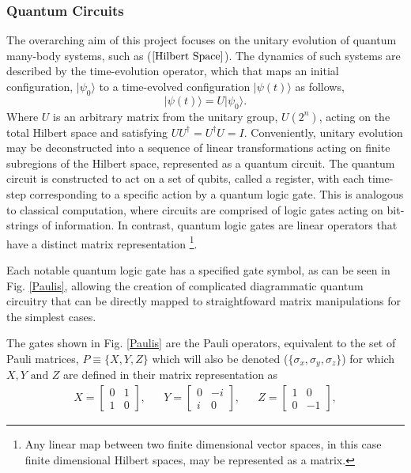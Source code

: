 \subsubsection{Quantum Circuits}

The overarching aim of this project focuses on the unitary evolution of quantum many-body systems, such as ($\refeq{Hilbert Space}$). The dynamics of such systems are described by the time-evolution operator, which that maps an initial configuration, $|\psi_0\rangle $ to a time-evolved configuration $|\psi(t)\rangle$ as follows, 
\begin{equation}
    |\psi (t)\rangle = U |\psi_0\rangle. 
\end{equation}
Where $U$ is an arbitrary matrix from the unitary group, $U(2^n)$, acting on the total Hilbert space and satisfying $UU^{\dagger} = U^{\dagger}U = I$. 
Conveniently, unitary evolution may be deconstructed into a sequence of linear transformations acting on finite subregions of the Hilbert space, represented as a quantum circuit.
The quantum circuit is constructed to act on a set of qubits, called a register, with each time-step corresponding to a specific action by a quantum logic gate.  
This is analogous to classical computation, where circuits are comprised of logic gates acting on bit-strings of information. 
In contrast, quantum logic gates are linear operators that have a distinct matrix representation \footnote{Any linear map between two finite dimensional vector spaces, in this case finite dimensional Hilbert spaces, may be represented as a matrix. }.  

Each notable quantum logic gate has a specified gate symbol, as can be seen in Fig. \ref{Paulis}, allowing the creation of complicated diagrammatic quantum circuitry that can be directly
mapped to straightfoward matrix manipulations for the simplest cases.



The gates shown in Fig. \ref{Paulis} are  the Pauli operators, equivalent
to the set of Pauli matrices, $P \equiv \{X, Y, Z\}$ which will also be denoted ($\{\sigma_{x}, \sigma_y, \sigma_z\}$) for which $X, Y \text{ and } Z$ are defined in their matrix representation as
\begin{align}
    \label{PauliMatrices}
    X = \begin{bmatrix}
            0 & 1 \\
            1 & 0
        \end{bmatrix},
     &  &
    Y = \begin{bmatrix}
            0  & -i \\
            i & 0
        \end{bmatrix},
     &  &
    Z = \begin{bmatrix}
            1 & 0  \\
            0 & -1
        \end{bmatrix},
\end{align}

